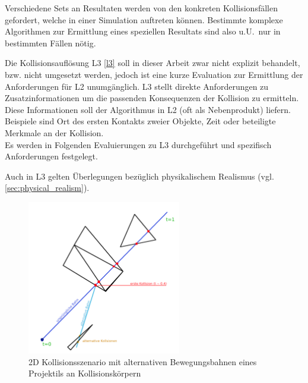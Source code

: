 Verschiedene Sets an Resultaten werden von den konkreten Kollisionsfällen gefordert, welche in einer Simulation auftreten können. Bestimmte komplexe Algorithmen zur Ermittlung eines speziellen Resultats sind also u.U.~nur in bestimmten Fällen nötig.

Die Kollisionsauflösung L3 \ref{l3} soll in dieser Arbeit zwar nicht explizit behandelt, bzw. nicht umgesetzt werden, jedoch ist eine kurze Evaluation zur Ermittlung der Anforderungen für L2 unumgänglich.
L3 stellt direkte Anforderungen zu Zusatzinformationen um die passenden Konsequenzen der Kollision zu ermitteln. Diese Informationen soll der Algorithmus in L2 (oft als Nebenprodukt) liefern. Beispiele sind Ort des ersten Kontakts zweier Objekte, Zeit oder beteiligte Merkmale an der Kollision.\\

Es werden in Folgenden Evaluierungen zu L3 durchgeführt und spezifisch Anforderungen festgelegt.

Auch in L3 gelten Überlegungen bezüglich physikalischem Realismus (vgl. \ref{sec:physical_realism}).

\begin{figure}
	\centering
	\includegraphics[width=0.6\textwidth]{./res/l3_col.png}
	\caption{2D Kollisionsszenario mit alternativen Bewegungsbahnen eines Projektils an Kollisionskörpern}
	\label{fig:l3col}
\end{figure}

